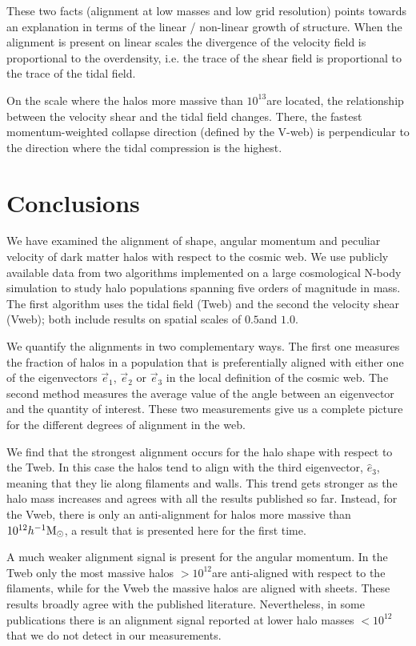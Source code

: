 \documentclass[useAMS,usenatbib]{mn2e}
\newcommand{\hMpc}{{\ifmmode{h^{-1}{\rm Mpc}}\else{$h^{-1}$Mpc }\fi}}
\newcommand{\hMsun}{{\ifmmode{h^{-1}{\rm
        {M_{\odot}}}}\else{$h^{-1}{\rm{M_{\odot}}}$~}\fi}}
\begin{document}
These two facts (alignment at low masses and low grid resolution)
points towards an explanation in terms of the  linear / non-linear
growth of structure. When the alignment is present on linear scales
the divergence of the velocity field is proportional to the
overdensity, i.e. the trace of the shear field is proportional to the
trace of the tidal field.

On the scale where the halos more massive than $10^{13}$\hMsun are
located, the relationship between the velocity shear and the tidal
field changes. There, the fastest momentum-weighted collapse direction
(defined by the V-web) is perpendicular to the direction where the
tidal compression is the highest. 

\section{Conclusions}
\label{sec:conclusions}

We have examined the alignment of shape, angular momentum and peculiar
velocity of dark matter halos with respect to the cosmic web. We use
publicly available data from two algorithms implemented on a large
cosmological N-body simulation to study halo populations spanning five
orders of magnitude in mass. The first algorithm uses the tidal field (Tweb)
and the second the velocity shear (Vweb); both include results on spatial scales of
$0.5$\hMpc and $1.0$\hMpc.   

We quantify the alignments in two complementary ways. The first one
measures the fraction of halos in a population that is preferentially
aligned with either one of the eigenvectors $\vec{e}_1$, $\vec{e}_2$
or $\vec{e}_3$ in the local definition of the cosmic web. The second
method measures the average value of the angle between an eigenvector
and the quantity of interest. These two measurements give us a
complete picture for the different degrees of alignment in the web.

We find that the strongest alignment occurs for the halo shape with
respect to the Tweb. In this case the halos tend to align with the
third eigenvector, $\hat{e}_3$, meaning that they lie along filaments
and walls. This trend gets stronger as the halo mass
increases and agrees with all the results published so far. Instead,
for the Vweb, there is only an anti-alignment for halos more massive
than $10^{12}\hMsun$, a result that is presented here for the first
time.

A much weaker alignment signal is present for the angular momentum. In
the Tweb only the most massive halos $>10^{12}$\hMsun are anti-aligned
with respect to the filaments, while for the Vweb the massive halos
are aligned with sheets. These results broadly agree with the
published literature. Nevertheless, in some publications
\citep{AragonCalvo2007,Hahn2007} there is an alignment signal
reported at lower halo masses $<10^{12}$\hMsun that we do not detect
in our measurements. 
\end{document}
